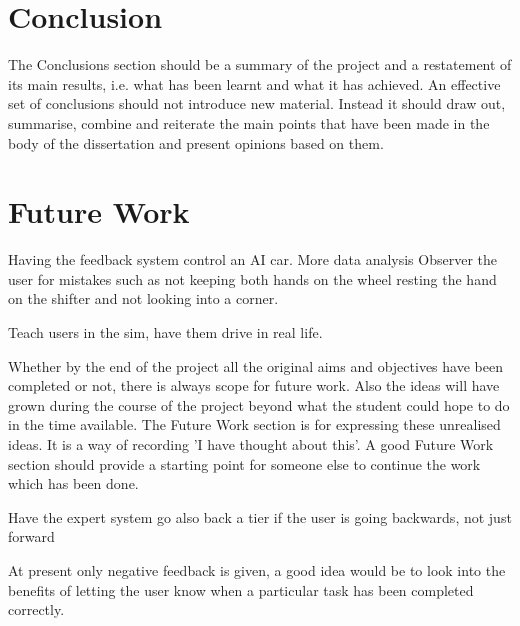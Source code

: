 \section{Conclusion}
The Conclusions section should be a summary of the project and a restatement of its main results,
i.e. what has been learnt and what it has achieved. An effective set of conclusions should not
introduce new material. Instead it should draw out, summarise, combine and reiterate the main
points that have been made in the body of the dissertation and present opinions based on them. 

\section{Future Work}

Having the feedback system control an AI car.
More data analysis
Observer the user for mistakes such as not keeping both hands on the wheel resting the hand on the shifter and not looking into a corner.

Teach users in the sim, have them drive in real life.

Whether by the end of the project all the original aims and objectives have been completed or not,
there is always scope for future work. Also the ideas will have grown during the course of the project
beyond what the student could hope to do in the time available. The Future Work section is for
expressing these unrealised ideas. It is a way of recording 'I have thought about this'. A good Future
Work section should provide a starting point for someone else to continue the work which has been
done. 

Have the expert system go also back a tier if the user is going backwards, not just forward

At present only negative feedback is given, a good idea would be to look into the benefits of letting the user know when a particular task has been completed correctly.